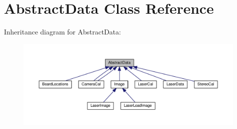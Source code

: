 \hypertarget{classAbstractData}{}\section{Abstract\+Data Class Reference}
\label{classAbstractData}


Inheritance diagram for Abstract\+Data\+:\nopagebreak
\begin{figure}[H]
\begin{center}
\leavevmode
\includegraphics[width=350pt]{classAbstractData__inherit__graph}
\end{center}
\end{figure}
